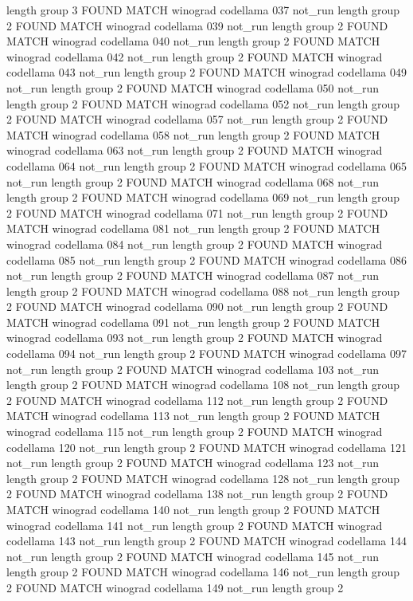 length group  3
FOUND MATCH winograd codellama 037 not_run
length group  2
FOUND MATCH winograd codellama 039 not_run
length group  2
FOUND MATCH winograd codellama 040 not_run
length group  2
FOUND MATCH winograd codellama 042 not_run
length group  2
FOUND MATCH winograd codellama 043 not_run
length group  2
FOUND MATCH winograd codellama 049 not_run
length group  2
FOUND MATCH winograd codellama 050 not_run
length group  2
FOUND MATCH winograd codellama 052 not_run
length group  2
FOUND MATCH winograd codellama 057 not_run
length group  2
FOUND MATCH winograd codellama 058 not_run
length group  2
FOUND MATCH winograd codellama 063 not_run
length group  2
FOUND MATCH winograd codellama 064 not_run
length group  2
FOUND MATCH winograd codellama 065 not_run
length group  2
FOUND MATCH winograd codellama 068 not_run
length group  2
FOUND MATCH winograd codellama 069 not_run
length group  2
FOUND MATCH winograd codellama 071 not_run
length group  2
FOUND MATCH winograd codellama 081 not_run
length group  2
FOUND MATCH winograd codellama 084 not_run
length group  2
FOUND MATCH winograd codellama 085 not_run
length group  2
FOUND MATCH winograd codellama 086 not_run
length group  2
FOUND MATCH winograd codellama 087 not_run
length group  2
FOUND MATCH winograd codellama 088 not_run
length group  2
FOUND MATCH winograd codellama 090 not_run
length group  2
FOUND MATCH winograd codellama 091 not_run
length group  2
FOUND MATCH winograd codellama 093 not_run
length group  2
FOUND MATCH winograd codellama 094 not_run
length group  2
FOUND MATCH winograd codellama 097 not_run
length group  2
FOUND MATCH winograd codellama 103 not_run
length group  2
FOUND MATCH winograd codellama 108 not_run
length group  2
FOUND MATCH winograd codellama 112 not_run
length group  2
FOUND MATCH winograd codellama 113 not_run
length group  2
FOUND MATCH winograd codellama 115 not_run
length group  2
FOUND MATCH winograd codellama 120 not_run
length group  2
FOUND MATCH winograd codellama 121 not_run
length group  2
FOUND MATCH winograd codellama 123 not_run
length group  2
FOUND MATCH winograd codellama 128 not_run
length group  2
FOUND MATCH winograd codellama 138 not_run
length group  2
FOUND MATCH winograd codellama 140 not_run
length group  2
FOUND MATCH winograd codellama 141 not_run
length group  2
FOUND MATCH winograd codellama 143 not_run
length group  2
FOUND MATCH winograd codellama 144 not_run
length group  2
FOUND MATCH winograd codellama 145 not_run
length group  2
FOUND MATCH winograd codellama 146 not_run
length group  2
FOUND MATCH winograd codellama 149 not_run
length group  2
